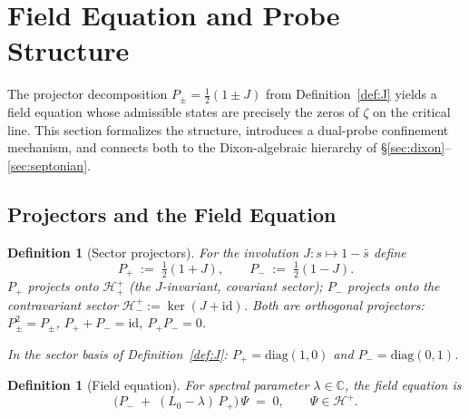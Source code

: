 \documentclass[12pt,a4paper]{article}
\newtheorem{definition}[theorem]{Definition}
\theoremstyle{remark}
\begin{document}
\section{Field Equation and Probe Structure}
\label{sec:field_probe}

The projector decomposition $P_\pm = \tfrac{1}{2}(1\pm J)$ from
Definition~\ref{def:J} yields a field equation whose admissible states
are precisely the zeros of $\zeta$ on the critical line.
This section formalizes the structure, introduces a dual-probe
confinement mechanism, and connects both to the Dixon-algebraic
hierarchy of \S\ref{sec:dixon}--\ref{sec:septonian}.

\subsection*{Projectors and the Field Equation}

\begin{definition}[Sector projectors]\label{def:projectors}
For the involution $J:s\mapsto1-\bar{s}$ define
\[
  P_+ \;:=\; \tfrac{1}{2}(1+J),
  \qquad
  P_- \;:=\; \tfrac{1}{2}(1-J).
\]
$P_+$ projects onto $\mathcal{H}^+_+$ (the $J$-invariant, covariant
sector); $P_-$ projects onto the contravariant sector
$\mathcal{H}^+_-:=\ker(J+\mathrm{id})$.
Both are orthogonal projectors: $P_\pm^2=P_\pm$, $P_++P_-=\mathrm{id}$,
$P_+P_-=0$.

In the sector basis of Definition~\ref{def:J}:
$P_+=\mathrm{diag}(1,0)$ and $P_-=\mathrm{diag}(0,1)$.
\end{definition}

\begin{definition}[Field equation]\label{def:field_eq}
For spectral parameter $\lambda\in\mathbb{C}$, the \emph{field equation} is
\[
  \bigl(P_- \;+\; (L_0-\lambda)\,P_+\bigr)\,\Psi \;=\; 0,
  \qquad \Psi\in\mathcal{H}^+.
\]
\end{definition}
\end{document}
